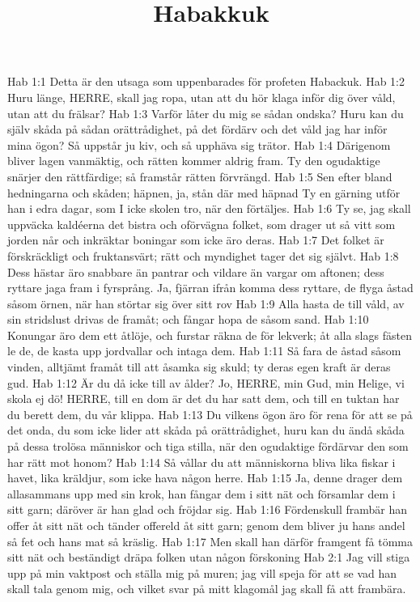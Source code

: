 

\title{Habakkuk}

Hab 1:1  Detta är den utsaga som uppenbarades för profeten Habackuk.
Hab 1:2  Huru länge, HERRE, skall jag ropa, utan att du hör klaga inför dig över våld, utan att du frälsar?
Hab 1:3  Varför låter du mig se sådan ondska? Huru kan du själv skåda på sådan orättrådighet, på det fördärv och det våld jag har inför mina ögon? Så uppstår ju kiv, och så upphäva sig trätor.
Hab 1:4  Därigenom bliver lagen vanmäktig, och rätten kommer aldrig fram. Ty den ogudaktige snärjer den rättfärdige; så framstår rätten förvrängd.
Hab 1:5  Sen efter bland hedningarna och skåden; häpnen, ja, stån där med häpnad Ty en gärning utför han i edra dagar, som I icke skolen tro, när den förtäljes.
Hab 1:6  Ty se, jag skall uppväcka kaldéerna det bistra och oförvägna folket, som drager ut så vitt som jorden når och inkräktar boningar som icke äro deras.
Hab 1:7  Det folket är förskräckligt och fruktansvärt; rätt och myndighet tager det sig självt.
Hab 1:8  Dess hästar äro snabbare än pantrar och vildare än vargar om aftonen; dess ryttare jaga fram i fyrsprång. Ja, fjärran ifrån komma dess ryttare, de flyga åstad såsom örnen, när han störtar sig över sitt rov
Hab 1:9  Alla hasta de till våld, av sin stridslust drivas de framåt; och fångar hopa de såsom sand.
Hab 1:10  Konungar äro dem ett åtlöje, och furstar räkna de för lekverk; åt alla slags fästen le de, de kasta upp jordvallar och intaga dem.
Hab 1:11  Så fara de åstad såsom vinden, alltjämt framåt till att åsamka sig skuld; ty deras egen kraft är deras gud.
Hab 1:12  Är du då icke till av ålder? Jo, HERRE, min Gud, min Helige, vi skola ej dö! HERRE, till en dom är det du har satt dem, och till en tuktan har du berett dem, du vår klippa.
Hab 1:13  Du vilkens ögon äro för rena för att se på det onda, du som icke lider att skåda på orättrådighet, huru kan du ändå skåda på dessa trolösa människor och tiga stilla, när den ogudaktige fördärvar den som har rätt mot honom?
Hab 1:14  Så vållar du att människorna bliva lika fiskar i havet, lika kräldjur, som icke hava någon herre.
Hab 1:15  Ja, denne drager dem allasammans upp med sin krok, han fångar dem i sitt nät och församlar dem i sitt garn; däröver är han glad och fröjdar sig.
Hab 1:16  Fördenskull frambär han offer åt sitt nät och tänder offereld åt sitt garn; genom dem bliver ju hans andel så fet och hans mat så kräslig.
Hab 1:17  Men skall han därför framgent få tömma sitt nät och beständigt dräpa folken utan någon förskoning
Hab 2:1  Jag vill stiga upp på min vaktpost och ställa mig på muren; jag vill speja för att se vad han skall tala genom mig, och vilket svar på mitt klagomål jag skall få att frambära.
